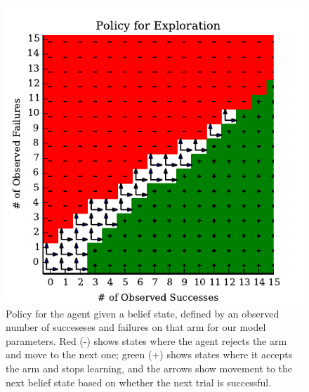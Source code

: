 \documentclass{article}
\begin{document}
\begin{figure}
\includegraphics{figures/policy.pdf}
\caption{Policy for the agent given a belief state, defined by an
  observed number of succeseses and failures on that arm for our model
  parameters.  Red (-) shows states where the agent rejects the arm
  and move to the next one; green (+) shows states where it accepts
  the arm and stops learning, and the arrows show movement to the next
  belief state based on whether the next trial is successful.}
\end{figure}
\end{document}
